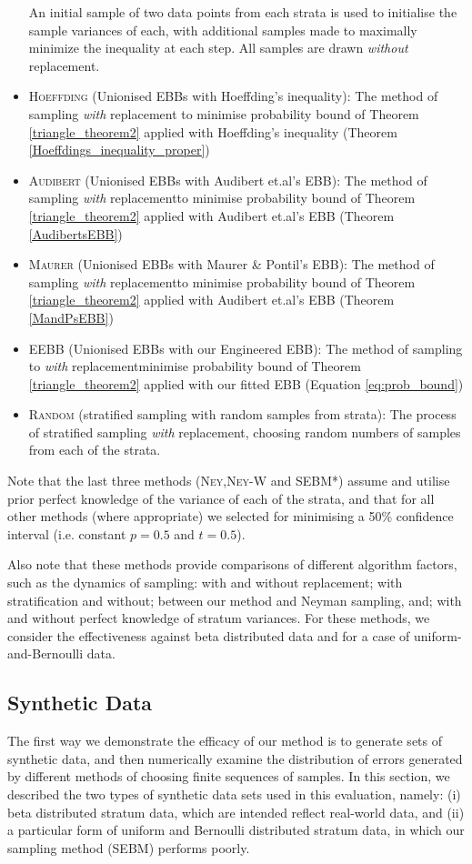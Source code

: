 \begin{itemize}
An initial sample of two data points from each strata is used to initialise the sample variances of each, with additional samples made to maximally minimize the inequality at each step. All samples are drawn \textit{without} replacement.
\item \textsc{Hoeffding} (Unionised EBBs with Hoeffding's inequality): The method of sampling \textit{with} replacement to minimise probability bound of Theorem \ref{triangle_theorem2} applied with Hoeffding's inequality (Theorem \ref{Hoeffdings_inequality_proper})
\item \textsc{Audibert} (Unionised EBBs with Audibert et.al's EBB): The method of sampling \textit{with} replacementto minimise probability bound of Theorem \ref{triangle_theorem2} applied with Audibert et.al's EBB (Theorem \ref{AudibertsEBB})
\item \textsc{Maurer} (Unionised EBBs with Maurer \& Pontil's EBB): The method of sampling \textit{with} replacementto minimise probability bound of Theorem \ref{triangle_theorem2} applied with Audibert et.al's EBB (Theorem \ref{MandPsEBB})
\item \textsc{EEBB} (Unionised EBBs with our Engineered EBB): The method of sampling to \textit{with} replacementminimise probability bound of Theorem \ref{triangle_theorem2} applied with our fitted EBB (Equation \ref{eq:prob_bound})
\item \textsc{Random} (stratified sampling with random samples from strata): The process of stratified sampling \textit{with} replacement, choosing random numbers of samples from each of the strata.
\end{itemize}
Note that the last three methods (\textsc{Ney},\textsc{Ney-W} and SEBM*) assume and utilise prior perfect knowledge of the variance of each of the strata, and that for all other methods (where appropriate) we selected for minimising a 50\% confidence interval (i.e. constant $p=0.5$ and $t=0.5$).

Also note that these methods provide comparisons of different algorithm factors, such as the dynamics of sampling: with and without replacement; with stratification and without; between our method and Neyman sampling, and; with and without perfect knowledge of stratum variances. 
For these methods, we consider the effectiveness against beta distributed data and for a case of uniform-and-Bernoulli data.

\subsection{Synthetic Data}
\label{ssec:SyntheticDists}
The first way we demonstrate the efficacy of our method is to generate sets of synthetic data, and then numerically examine the distribution of errors generated by different methods of choosing finite sequences of samples.
In this section, we described the two types of synthetic data sets used in this evaluation, namely: 
(i) beta distributed stratum data, which are intended reflect real-world data, and 
(ii) a particular form of uniform and Bernoulli distributed stratum data, in which our sampling method (SEBM) performs poorly.


